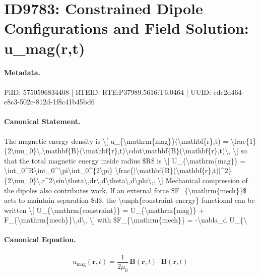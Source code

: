 \section*{ID9783: Constrained Dipole Configurations and Field Solution: u\_mag(r,t)}
\paragraph{Metadata.}
PiID: 5750596834408 | RTEID: RTE:P37989.5616:T6.0464 | UUID: cdc2d464-e8c3-502c-812d-1f8c41b45bd6

\paragraph{Canonical Statement.}
The magnetic energy density is \textbackslash{}[ u\_\{\textbackslash{}mathrm\{mag\}\}(\textbackslash{}mathbf\{r\},t) = \textbackslash{}frac\{1\}\{2\textbackslash{}mu\_0\}\textbackslash{},\textbackslash{}mathbf\{B\}(\textbackslash{}mathbf\{r\},t)\textbackslash{}cdot\textbackslash{}mathbf\{B\}(\textbackslash{}mathbf\{r\},t)\textbackslash{}, \textbackslash{}] so that the total magnetic energy inside radius \$R\$ is \textbackslash{}[ U\_\{\textbackslash{}mathrm\{mag\}\} = \textbackslash{}int\_0\textasciicircum{}R\textbackslash{}int\_0\textasciicircum{}\textbackslash{}pi\textbackslash{}int\_0\textasciicircum{}\{2\textbackslash{}pi\} \textbackslash{}frac\{|\textbackslash{}mathbf\{B\}(\textbackslash{}mathbf\{r\},t)|\textasciicircum{}2\}\{2\textbackslash{}mu\_0\}\textbackslash{},r\textasciicircum{}2\textbackslash{}sin\textbackslash{}theta\textbackslash{},dr\textbackslash{},d\textbackslash{}theta\textbackslash{},d\textbackslash{}phi\textbackslash{},. \textbackslash{}] Mechanical compression of the dipoles also contributes work. If an external force \$F\_\{\textbackslash{}mathrm\{mech\}\}\$ acts to maintain separation \$d\$, the \textbackslash{}emph\{constraint energy\} functional can be written \textbackslash{}[ U\_\{\textbackslash{}mathrm\{constraint\}\} = U\_\{\textbackslash{}mathrm\{mag\}\} + F\_\{\textbackslash{}mathrm\{mech\}\}\textbackslash{},d\textbackslash{}, \textbackslash{}] with \$F\_\{\textbackslash{}mathrm\{mech\}\} = -\textbackslash{}nabla\_d U\_\{\textbackslash{}

\paragraph{Canonical Equation.}
\[
u_{\mathrm{mag}}(\mathbf{r},t) = \frac{1}{2\mu_0}\,\mathbf{B}(\mathbf{r},t)\cdot\mathbf{B}(\mathbf{r},t)\,
\]

